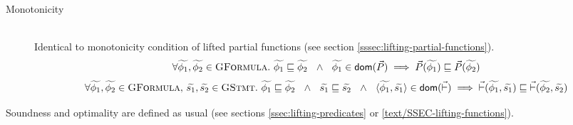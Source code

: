 \begin{description}
    \item[Monotonicity]~\\
    Identical to monotonicity condition of lifted partial functions (see section \ref{sssec:lifting-partial-functions}). %
    \begin{displaymath}
    \forall \widetilde{\phi_1}, \widetilde{\phi_2} \in \textup{\textsc{GFormula}}.~ 
    \widetilde{\phi_1} \sqsubseteq \widetilde{\phi_2} ~~\wedge~~ \widetilde{\phi_1} \in \textup{\textsf{dom}}(\vec{P}) 
    \implies 
    \vec{P}(\widetilde{\phi_1}) \sqsubseteq \vec{P}(\widetilde{\phi_2})
    \end{displaymath}
    \textcolor{gray}{
        \begin{displaymath}
        \forall \widetilde{\phi_1}, \widetilde{\phi_2} \in \textup{\textsc{GFormula}},\, \widetilde{s_1}, \widetilde{s_2} \in \textup{\textsc{GStmt}}.~ 
        \widetilde{\phi_1} \sqsubseteq \widetilde{\phi_2} ~~\wedge~~ \widetilde{s_1} \sqsubseteq \widetilde{s_2} ~~\wedge~~ \langle \widetilde{\phi_1}, \widetilde{s_1} \rangle \in \textup{\textsf{dom}}(\vec{\vdash}) 
        \implies 
        \vec{\vdash}(\widetilde{\phi_1}, \widetilde{s_1}) \sqsubseteq \vec{\vdash}(\widetilde{\phi_2}, \widetilde{s_2})
        \end{displaymath}
    }
\end{description}

Soundness and optimality are defined as usual (see sections \ref{ssec:lifting-predicates} or \ref{text/SSEC-lifting-functions}).

